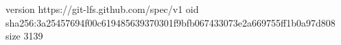 version https://git-lfs.github.com/spec/v1
oid sha256:3a25457694f00c619485639370301f9bfb067433073e2a669755ff1b0a97d808
size 3139
